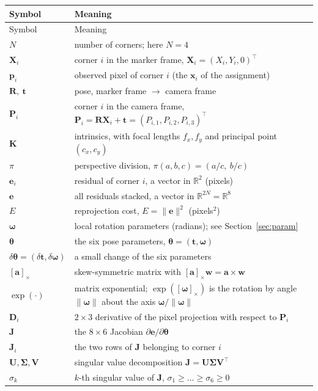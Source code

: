 \documentclass[11pt,a4paper]{article}
\theoremstyle{remark}
\newcommand{\Rset}{\mathbb{R}}
\newcommand{\Rmat}{\mathbf{R}}
\newcommand{\Jmat}{\mathbf{J}}
\newcommand{\Kmat}{\mathbf{K}}
\newcommand{\Dmat}{\mathbf{D}}
\newcommand{\Umat}{\mathbf{U}}
\newcommand{\Vmat}{\mathbf{V}}
\newcommand{\Sigmat}{\boldsymbol{\Sigma}}
\newcommand{\evec}{\mathbf{e}}
\newcommand{\Pvec}{\mathbf{P}}
\newcommand{\pvec}{\mathbf{p}}
\newcommand{\tvec}{\mathbf{t}}
\newcommand{\wvec}{\mathbf{w}}
\newcommand{\Xvec}{\mathbf{X}}
\newcommand{\xvec}{\mathbf{x}}
\newcommand{\avec}{\mathbf{a}}
\newcommand{\thetavec}{\boldsymbol{\theta}}
\newcommand{\dth}{\delta\boldsymbol{\theta}}
\newcommand{\omegavec}{\boldsymbol{\omega}}
\newcommand{\dom}{\delta\boldsymbol{\omega}}
\newcommand{\dtv}{\delta\mathbf{t}}
\newcommand{\skewm}[1]{[#1]_{\times}}
\begin{document}
\begin{longtable}{@{}lp{11.2cm}@{}}
\toprule
Symbol & Meaning \\
\midrule
\endfirsthead
\toprule
Symbol & Meaning \\
\midrule
\endhead
$N$ & number of corners; here $N = 4$ \\
$\Xvec_i$ & corner $i$ in the marker frame, $\Xvec_i = (X_i,Y_i,0)^{\top}$ \\
$\pvec_i$ & observed pixel of corner $i$ (the $\xvec_i$ of the assignment) \\
$\Rmat,\ \tvec$ & pose, marker frame $\to$ camera frame \\
$\Pvec_i$ & corner $i$ in the camera frame, $\Pvec_i = \Rmat\Xvec_i + \tvec
  = (P_{i,1},P_{i,2},P_{i,3})^{\top}$ \\
$\Kmat$ & intrinsics, with focal lengths $f_x,f_y$ and principal point
  $(c_x,c_y)$ \\
$\pi$ & perspective division, $\pi(a,b,c) = (a/c,\ b/c)$ \\
$\evec_i$ & residual of corner $i$, a vector in $\Rset^2$ (pixels) \\
$\evec$ & all residuals stacked, a vector in $\Rset^{2N} = \Rset^8$ \\
$E$ & reprojection cost, $E = \|\evec\|^2$ (pixels$^2$) \\
$\omegavec$ & local rotation parameters (radians); see
  Section~\ref{sec:param} \\
$\thetavec$ & the six pose parameters, $\thetavec = (\tvec,\omegavec)$ \\
$\dth = (\dtv,\dom)$ & a small change of the six parameters \\
$\skewm{\avec}$ & skew-symmetric matrix with $\skewm{\avec}\wvec =
  \avec\times\wvec$ \\
$\exp(\cdot)$ & matrix exponential; $\exp(\skewm{\omegavec})$ is the rotation by
  angle $\|\omegavec\|$ about the axis $\omegavec/\|\omegavec\|$ \\
$\Dmat_i$ & $2\times3$ derivative of the pixel projection with respect to
  $\Pvec_i$ \\
$\Jmat$ & the $8\times6$ Jacobian $\partial\evec/\partial\thetavec$ \\
$\Jmat_i$ & the two rows of $\Jmat$ belonging to corner $i$ \\
$\Umat,\Sigmat,\Vmat$ & singular value decomposition $\Jmat =
  \Umat\Sigmat\Vmat^{\top}$ \\
$\sigma_k$ & $k$-th singular value of $\Jmat$,
  $\sigma_1 \ge \dots \ge \sigma_6 \ge 0$ \\

\end{longtable}
\end{document}
